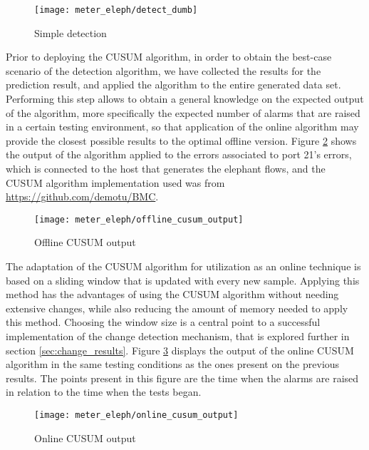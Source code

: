 \begin{figure}[H]
    \centering
    \texttt{[image: meter\_eleph/detect\_dumb]}
    \caption {Simple detection}
    \label{fig:detect_dumb}
\end{figure} 

\par Prior to deploying the CUSUM algorithm, in order to obtain the best-case scenario of the detection algorithm, we have collected the results for the prediction
result, and applied the algorithm to the entire generated data set. Performing this step allows to obtain a general knowledge on the expected output of the algorithm,
more specifically the expected number of alarms that are raised in a certain testing environment, so that application of the online algorithm may provide the
closest possible results to the optimal offline version. Figure  \ref{fig:offline_cusum} shows the output of the algorithm applied to the errors associated to
port 21's errors, which is connected to the host that generates the elephant flows, and the CUSUM algorithm implementation used was from 
\url{https://github.com/demotu/BMC}.

\begin{figure} [H]
    \centering
    \texttt{[image: meter\_eleph/offline\_cusum\_output]}
    \caption {Offline CUSUM output}
    \label{fig:offline_cusum}
\end{figure} 

\par The adaptation of the CUSUM algorithm for utilization as an online technique is based on a sliding window that is updated with every new sample. Applying this
method has the advantages of using the CUSUM algorithm without needing extensive changes, while also reducing the amount of memory needed to apply this method. 
Choosing the window size is a central point to a successful implementation of the change detection mechanism, that is explored further in section 
\ref{sec:change_results}. Figure \ref{fig:online_cusum} displays the output of the online CUSUM algorithm in the same testing conditions as the ones present on
the previous results. The points present in this figure are the time when the alarms are raised in relation to the time when the tests began.

\begin{figure} [H]
    \centering
    \texttt{[image: meter\_eleph/online\_cusum\_output]}
    \caption {Online CUSUM output}
    \label{fig:online_cusum}
\end{figure} 

